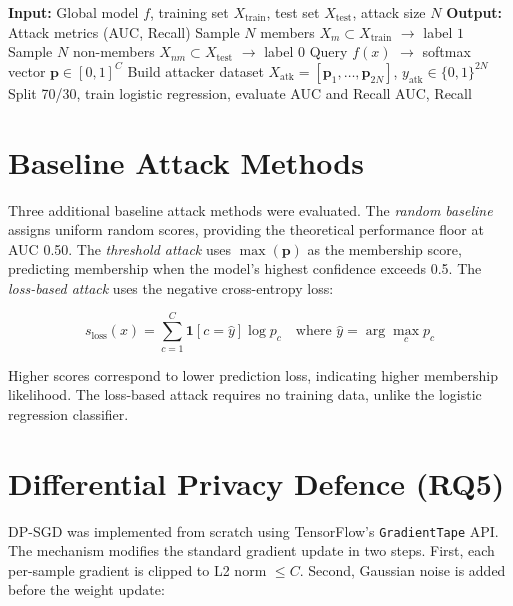 \documentclass[12pt, a4paper]{report}
\begin{document}
\begin{algorithm}[H]
\caption{Black-Box Membership Inference Attack}
\label{alg:mia}
\begin{algorithmic}[1]
\State \textbf{Input:} Global model $f$, training set $X_{\text{train}}$, test set $X_{\text{test}}$, attack size $N$
\State \textbf{Output:} Attack metrics (AUC, Recall)
\State Sample $N$ members $X_m \subset X_{\text{train}}$ $\rightarrow$ label $1$
\State Sample $N$ non-members $X_{nm} \subset X_{\text{test}}$ $\rightarrow$ label $0$
    \State Query $f(x)$ $\rightarrow$ softmax vector $\mathbf{p} \in [0,1]^C$
\EndFor
\State Build attacker dataset $X_{\text{atk}} = [\mathbf{p}_1, \ldots, \mathbf{p}_{2N}]$, $y_{\text{atk}} \in \{0,1\}^{2N}$
\State Split 70/30, train logistic regression, evaluate AUC and Recall
\State \Return AUC, Recall
\end{algorithmic}
\end{algorithm}

\section{Baseline Attack Methods}

Three additional baseline attack methods were evaluated. The \textit{random
baseline} assigns uniform random scores, providing the theoretical performance
floor at AUC 0.50. The \textit{threshold attack} uses $\max(\mathbf{p})$ as the
membership score, predicting membership when the model's highest confidence
exceeds 0.5. The \textit{loss-based attack} uses the negative cross-entropy loss:

\begin{equation}
  s_{\text{loss}}(x) = \sum_{c=1}^{C} \mathbf{1}[c = \hat{y}] \log p_c
  \quad \text{where } \hat{y} = \arg\max_c p_c
\end{equation}

\noindent Higher scores correspond to lower prediction loss, indicating higher
membership likelihood. The loss-based attack requires no training data, unlike the
logistic regression classifier.

\section{Differential Privacy Defence (RQ5)}
\label{sec:dpmethod}

DP-SGD was implemented from scratch using TensorFlow's \texttt{GradientTape} API.
The mechanism modifies the standard gradient update in two steps. First, each
per-sample gradient is clipped to L2 norm $\leq C$. Second, Gaussian noise is
added before the weight update:
\end{document}
